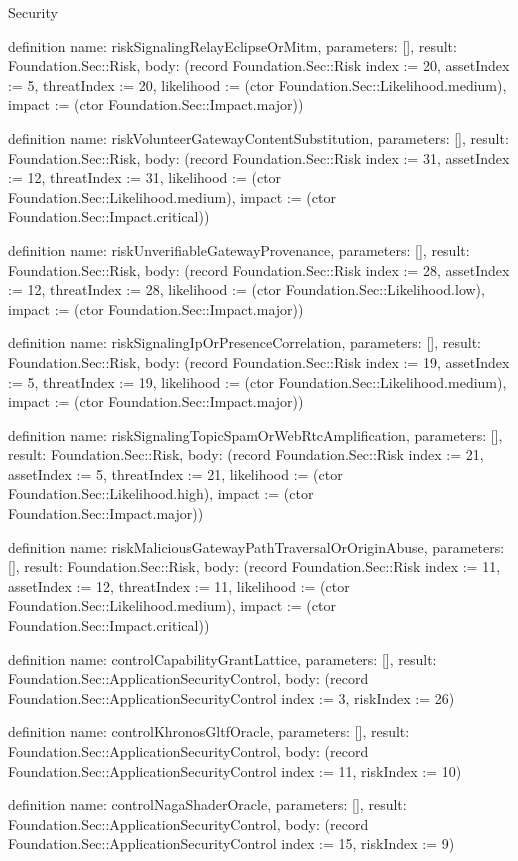 \begin{lexlean}{Security}
\begin{semanticmodule}
definition{
  name: riskSignalingRelayEclipseOrMitm,
  parameters: [],
  result: Foundation.Sec::Risk,
  body: (record Foundation.Sec::Risk {index := 20, assetIndex := 5, threatIndex := 20, likelihood := (ctor Foundation.Sec::Likelihood.medium), impact := (ctor Foundation.Sec::Impact.major)})
}

definition{
  name: riskVolunteerGatewayContentSubstitution,
  parameters: [],
  result: Foundation.Sec::Risk,
  body: (record Foundation.Sec::Risk {index := 31, assetIndex := 12, threatIndex := 31, likelihood := (ctor Foundation.Sec::Likelihood.medium), impact := (ctor Foundation.Sec::Impact.critical)})
}

definition{
  name: riskUnverifiableGatewayProvenance,
  parameters: [],
  result: Foundation.Sec::Risk,
  body: (record Foundation.Sec::Risk {index := 28, assetIndex := 12, threatIndex := 28, likelihood := (ctor Foundation.Sec::Likelihood.low), impact := (ctor Foundation.Sec::Impact.major)})
}

definition{
  name: riskSignalingIpOrPresenceCorrelation,
  parameters: [],
  result: Foundation.Sec::Risk,
  body: (record Foundation.Sec::Risk {index := 19, assetIndex := 5, threatIndex := 19, likelihood := (ctor Foundation.Sec::Likelihood.medium), impact := (ctor Foundation.Sec::Impact.major)})
}

definition{
  name: riskSignalingTopicSpamOrWebRtcAmplification,
  parameters: [],
  result: Foundation.Sec::Risk,
  body: (record Foundation.Sec::Risk {index := 21, assetIndex := 5, threatIndex := 21, likelihood := (ctor Foundation.Sec::Likelihood.high), impact := (ctor Foundation.Sec::Impact.major)})
}

definition{
  name: riskMaliciousGatewayPathTraversalOrOriginAbuse,
  parameters: [],
  result: Foundation.Sec::Risk,
  body: (record Foundation.Sec::Risk {index := 11, assetIndex := 12, threatIndex := 11, likelihood := (ctor Foundation.Sec::Likelihood.medium), impact := (ctor Foundation.Sec::Impact.critical)})
}

definition{
  name: controlCapabilityGrantLattice,
  parameters: [],
  result: Foundation.Sec::ApplicationSecurityControl,
  body: (record Foundation.Sec::ApplicationSecurityControl {index := 3, riskIndex := 26})
}

definition{
  name: controlKhronosGltfOracle,
  parameters: [],
  result: Foundation.Sec::ApplicationSecurityControl,
  body: (record Foundation.Sec::ApplicationSecurityControl {index := 11, riskIndex := 10})
}

definition{
  name: controlNagaShaderOracle,
  parameters: [],
  result: Foundation.Sec::ApplicationSecurityControl,
  body: (record Foundation.Sec::ApplicationSecurityControl {index := 15, riskIndex := 9})
}


\end{semanticmodule}
\end{lexlean}
